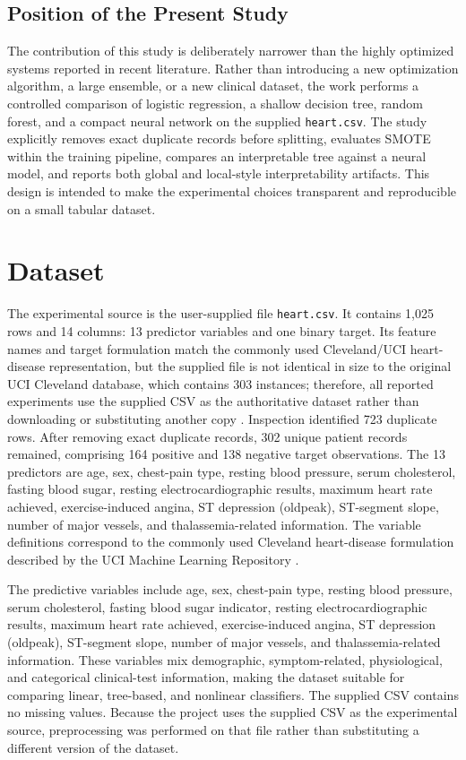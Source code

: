 \documentclass[10pt]{article}
\begin{document}
\subsection{Position of the Present Study}
The contribution of this study is deliberately narrower than the highly optimized systems reported in recent literature. Rather than introducing a new optimization algorithm, a large ensemble, or a new clinical dataset, the work performs a controlled comparison of logistic regression, a shallow decision tree, random forest, and a compact neural network on the supplied \texttt{heart.csv}. The study explicitly removes exact duplicate records before splitting, evaluates SMOTE within the training pipeline, compares an interpretable tree against a neural model, and reports both global and local-style interpretability artifacts. This design is intended to make the experimental choices transparent and reproducible on a small tabular dataset.

\section{Dataset}
The experimental source is the user-supplied file \texttt{heart.csv}. It contains 1,025 rows and 14 columns: 13 predictor variables and one binary target. Its feature names and target formulation match the commonly used Cleveland/UCI heart-disease representation, but the supplied file is not identical in size to the original UCI Cleveland database, which contains 303 instances; therefore, all reported experiments use the supplied CSV as the authoritative dataset rather than downloading or substituting another copy \citep{uciheart}. Inspection identified 723 duplicate rows. After removing exact duplicate records, 302 unique patient records remained, comprising 164 positive and 138 negative target observations. The 13 predictors are age, sex, chest-pain type, resting blood pressure, serum cholesterol, fasting blood sugar, resting electrocardiographic results, maximum heart rate achieved, exercise-induced angina, ST depression (oldpeak), ST-segment slope, number of major vessels, and thalassemia-related information. The variable definitions correspond to the commonly used Cleveland heart-disease formulation described by the UCI Machine Learning Repository \citep{uciheart}.

The predictive variables include age, sex, chest-pain type, resting blood pressure, serum cholesterol, fasting blood sugar indicator, resting electrocardiographic results, maximum heart rate achieved, exercise-induced angina, ST depression (oldpeak), ST-segment slope, number of major vessels, and thalassemia-related information. These variables mix demographic, symptom-related, physiological, and categorical clinical-test information, making the dataset suitable for comparing linear, tree-based, and nonlinear classifiers. The supplied CSV contains no missing values. Because the project uses the supplied CSV as the experimental source, preprocessing was performed on that file rather than substituting a different version of the dataset.
\end{document}
